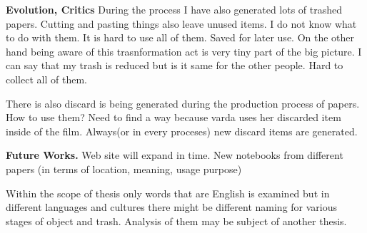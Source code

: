 %
%
\textbf{Evolution, Critics} During the process I have also generated lots of trashed papers. Cutting and pasting things also leave unused items. I do not know what to do with them. It is hard to use all of them. Saved for later use. On the other hand being aware of this trasnformation act is very tiny part of the big picture. I can say that my trash is reduced but is it same for the other people. Hard to collect all of them. 

There is also discard is being generated during the production process of papers. How to use them? Need to find a way because varda uses her discarded item inside of the film. Always(or in every proceses) new discard items are generated.






%
%
\textbf{Future Works.} Web site will expand in time. New notebooks from different papers (in terms of location, meaning, usage purpose)

Within the scope of thesis only words that are English is examined but in different languages and cultures there might be different naming for various stages of object and trash. Analysis of them may be subject of another thesis.




